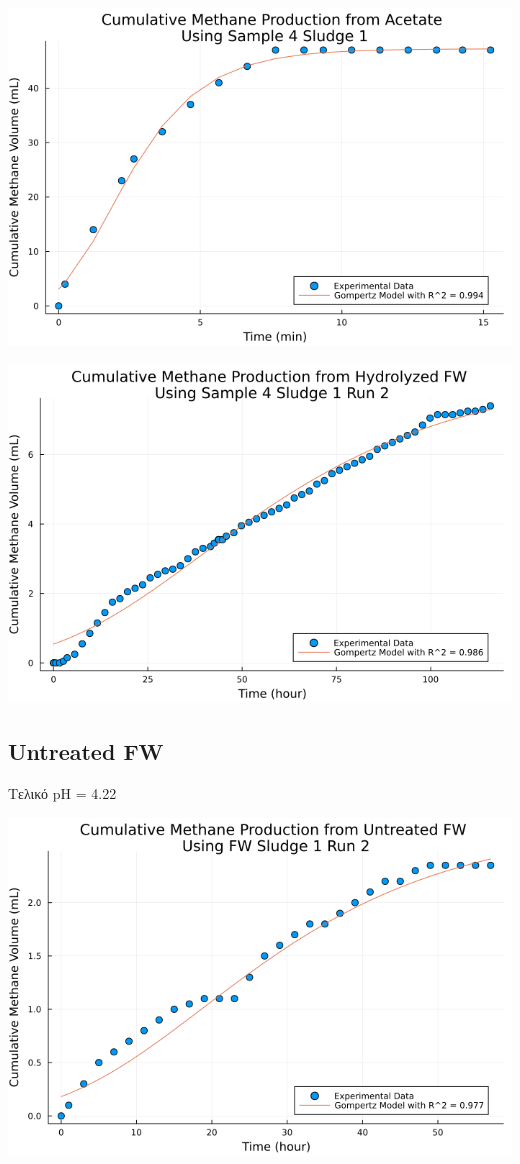 \documentclass[11pt]{article}
\begin{document}
\begin{center}
\includegraphics[width=.9\linewidth]{../plots/BMPs/Acetate/methane_kinetics_acet_test_4_s1_min.png}
\end{center}

\begin{center}
\includegraphics[width=.9\linewidth]{../plots/BMPs/Hydrolyzed FW/methane_kinetics_hydrolysate_4_s1_r2_hour.png}
\end{center}

\subsection{Untreated FW}
\label{sec:orgbe5def1}
Τελικό pH = 4.22

\begin{center}
\includegraphics[width=.9\linewidth]{../plots/BMPs/Untreated FW/methane_kinetics_untreated_fw_s1_r2_hour.png}
\end{center}
\end{document}
